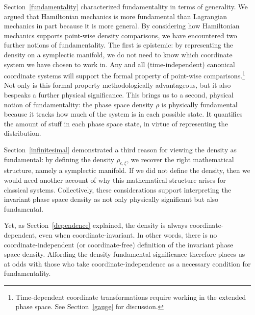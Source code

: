 \documentclass[letterpaper]{article}
\begin{document}

Section~\ref{fundamentality} characterized fundamentality in terms of generality. We argued that Hamiltonian mechanics is more fundamental than Lagrangian mechanics in part because it is more general. By considering how Hamiltonian mechanics supports point-wise density comparisons, we have encountered two further notions of fundamentality. The first is epistemic: by representing the density on a symplectic manifold, we do not need to know which coordinate system we have chosen to work in. Any and all (time-independent) canonical coordinate systems will support the formal property of point-wise comparisons.\footnote{Time-dependent coordinate transformations require working in the extended phase space. See Section~\ref{gauge} for discussion.} Not only is this formal property methodologically advantageous, but it also bespeaks a further physical significance. This brings us to a second, physical notion of fundamentality: the phase space density $\rho$ is physically fundamental because it tracks how much of the system is in each possible state. It quantifies the amount of stuff in each phase space state, in virtue of representing the distribution. 

Section~\ref{infinitesimal} demonstrated a third reason for viewing the density as fundamental: by defining the density $\rho_{c, \xi}$, we recover the right mathematical structure, namely a symplectic manifold. If we did not define the density, then we would need another account of why this mathematical structure arises for classical systems. Collectively, these considerations support interpreting the invariant phase space density as not only physically significant but also fundamental. 

Yet, as Section~\ref{dependence} explained, the density is always coordinate-dependent, even when coordinate-invariant. In other words, there is no coordinate-independent (or coordinate-free) definition of the invariant phase space density. Affording the density fundamental significance therefore places us at odds with those who take coordinate-independence as a necessary condition for fundamentality. 
\end{document}
